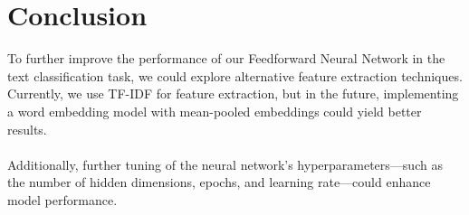 \documentclass{article}
\begin{document}
\section*{Conclusion}
 
To further improve the performance of our Feedforward Neural Network in the text classification task, we could explore alternative feature extraction techniques. Currently, we use TF-IDF for feature extraction, but in the future, implementing a word embedding model with mean-pooled embeddings could yield better results. \\ \\
\noindent
Additionally, further tuning of the neural network's hyperparameters—such as the number of hidden dimensions, epochs, and learning rate—could enhance model performance.
\end{document}
